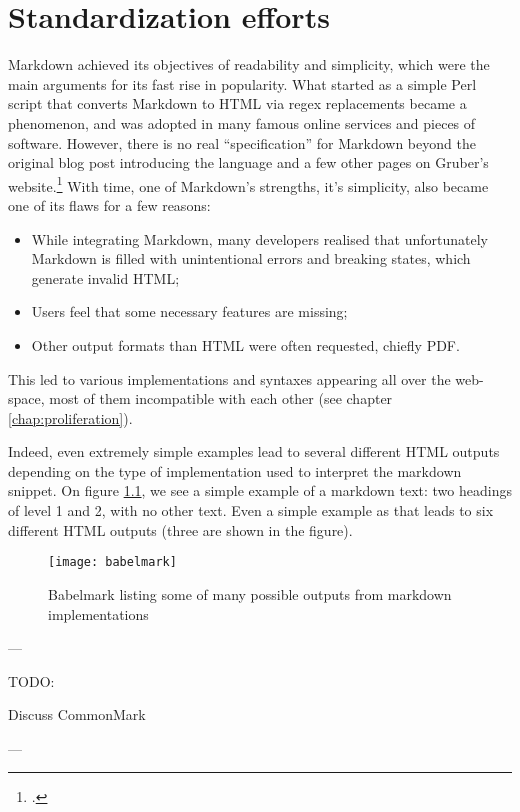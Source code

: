 \chapter{Standardization efforts}
\label{chap:standardization}

\vspace{1cm}

Markdown achieved its objectives of readability and simplicity, which were the main arguments for its fast rise in popularity.
What started as a simple Perl script that converts Markdown to HTML via regex replacements became a phenomenon, and was adopted in many
famous online services and pieces of software. However, there is no real ``specification'' for Markdown beyond the original blog post
introducing the language and a few other pages on Gruber's website.\footcite{gruber2004markdown}
With time, one of Markdown's strengths, it's simplicity, also became one of its flaws for a few reasons:

\begin{itemize}
    \item While integrating Markdown, many developers realised that unfortunately Markdown is filled with unintentional errors
    and breaking states, which generate invalid HTML;
    \item Users feel that some necessary features are missing;
    \item Other output formats than HTML were often requested, chiefly PDF.
\end{itemize}

This led to various implementations and syntaxes appearing all over the web-space, most of them incompatible with each other
(see chapter \ref{chap:proliferation}).\newline

Indeed, even extremely simple examples lead to several different HTML outputs depending on the type of implementation used to
interpret the markdown snippet. On figure \ref{fig:babelmark}, we see a simple example of a markdown text: two headings of
level 1 and 2, with no other text. Even a simple example as that leads to six different HTML outputs (three are shown in the figure).

\begin{figure}[H]
\centering
\texttt{[image: babelmark]}
\caption{Babelmark listing some of many possible outputs from markdown implementations}
\label{fig:babelmark}
\end{figure}

---

TODO:

Discuss CommonMark

---

\cite{leonard2016text}